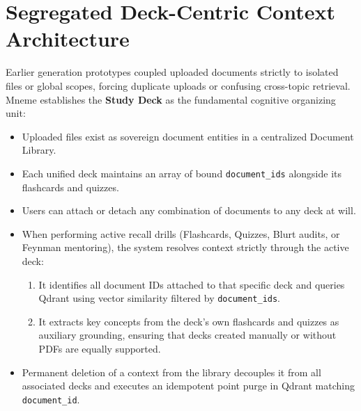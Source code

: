 \documentclass[12pt,a4paper,oneside]{report}
\begin{document}
\section{Segregated Deck-Centric Context Architecture}
Earlier generation prototypes coupled uploaded documents strictly to isolated files or global scopes, forcing duplicate uploads or confusing cross-topic retrieval. Mneme establishes the \textbf{Study Deck} as the fundamental cognitive organizing unit:
\begin{itemize}
    \item Uploaded files exist as sovereign document entities in a centralized Document Library.
    \item Each unified deck maintains an array of bound \texttt{document\_ids} alongside its flashcards and quizzes.
    \item Users can attach or detach any combination of documents to any deck at will.
    \item When performing active recall drills (Flashcards, Quizzes, Blurt audits, or Feynman mentoring), the system resolves context strictly through the active deck:
    \begin{enumerate}
        \item It identifies all document IDs attached to that specific deck and queries Qdrant using vector similarity filtered by \texttt{document\_ids}.
        \item It extracts key concepts from the deck's own flashcards and quizzes as auxiliary grounding, ensuring that decks created manually or without PDFs are equally supported.
    \end{enumerate}
    \item Permanent deletion of a context from the library decouples it from all associated decks and executes an idempotent point purge in Qdrant matching \texttt{document\_id}.
\end{itemize}
\end{document}
